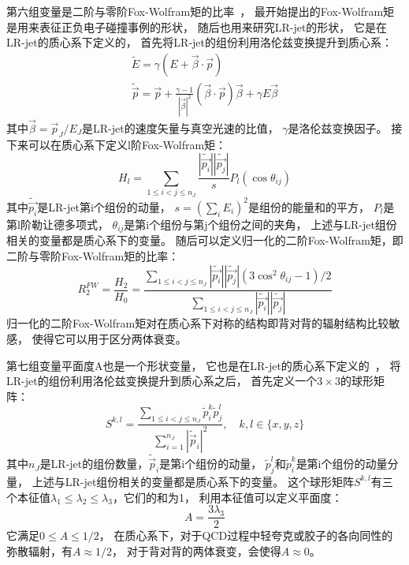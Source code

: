 第六组变量是二阶与零阶Fox-Wolfram矩的比率~\cite{JSS5}，
最开始提出的Fox-Wolfram矩是用来表征正负电子碰撞事例的形状，
随后也用来研究LR-jet的形状，
它是在LR-jet的质心系下定义的，
首先将LR-jet的组份利用洛伦兹变换提升到质心系：
\begin{equation} 
\label{eq:JSS5}
 \begin{aligned}
 \tilde{E}=\gamma(E+\vec{\beta}\cdot \vec{p})
\\
\tilde{\vec{p}}=\vec{p}+\frac{\gamma-1}{|\vec{\beta}|^2} (\vec{\beta}\cdot \vec{p}) \vec{\beta}+\gamma E\vec{\beta}
 \end{aligned}
\end{equation}
其中$\vec{\beta}=\vec{p}_J/E_J$是LR-jet的速度矢量与真空光速的比值，
$\gamma$是洛伦兹变换因子。
接下来可以在质心系下定义l阶Fox-Wolfram矩：
\begin{equation} 
\label{eq:JSS6}
H_l=\sum_{1\le i<j\le n_J} \frac{|\tilde{\vec{p_i}}| |\tilde{\vec{p_j}}|}{s} P_l (\cos \theta_{ij})
\end{equation}
其中$\tilde{\vec{p_i}}$是LR-jet第i个组份的动量，
$s=(\sum_i E_i)^2$是组份的能量和的平方，
$P_l$是第l阶勒让德多项式，
$\theta_{ij}$是第i个组份与第j个组份之间的夹角，
上述与LR-jet组份相关的变量都是质心系下的变量。
随后可以定义归一化的二阶Fox-Wolfram矩，即二阶与零阶Fox-Wolfram矩的比率：
\begin{equation} 
\label{eq:JSS6}
R_2^{FW}=\frac{H_2}{H_0}=\frac{\sum_{1\le i<j\le n_J} |\tilde{\vec{p_i}}| |\tilde{\vec{p_j}}|  (3\cos^2 \theta_{ij}-1 )/2 }
{\sum_{1\le i<j\le n_J} |\tilde{\vec{p_i}}| |\tilde{\vec{p_j}}|}
\end{equation}
归一化的二阶Fox-Wolfram矩对在质心系下对称的结构即背对背的辐射结构比较敏感，
使得它可以用于区分两体衰变。

第七组变量平面度A也是一个形状变量，
它也是在LR-jet的质心系下定义的~\cite{JSS6}，
将LR-jet的组份利用洛伦兹变换提升到质心系之后，
首先定义一个$3\times 3$的球形矩阵：
\begin{equation} 
\label{eq:JSS65}
S^{k,l}=\frac{ \sum_{1\le i<j\le n_J} \tilde{p}_i^k  \tilde{p}_j^l  }
{\sum_{i=1}^{n_J} |\tilde{\vec{p}}_i|^2}
,\quad k,l \in \{x,y,z\}
\end{equation}
其中$n_J$是LR-jet的组份数量，$\tilde{\vec{p}}_i$是第i个组份的动量，
$\tilde{p}_j^l$和$\tilde{p}_i^k$是第i个组份的动量分量，
上述与LR-jet组份相关的变量都是质心系下的变量。
这个球形矩阵$S^{k,l}$有三个本征值$\lambda_1\le \lambda_2\le \lambda_3$，它们的和为1，
利用本征值可以定义平面度：
\begin{equation} 
\label{eq:JSS65}
A=\frac{3\lambda_3}{2}
\end{equation}
它满足$0\le A \le 1/2$，
在质心系下，对于QCD过程中轻夸克或胶子的各向同性的弥散辐射，有$A\approx 1/2$，
对于背对背的两体衰变，会使得$A \approx 0$。


